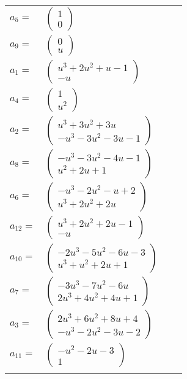 \documentclass[1p]{elsarticle_modified}
\theoremstyle{definition}
\begin{document}
\begin{tabular}{m{7pt} m{180pt} m{7pt} m{180pt} }
\flushright $a_{5}=$&$\begin{pmatrix}1\\0\end{pmatrix}$ \\
\flushright $a_{9}=$&$\begin{pmatrix}0\\u\end{pmatrix}$ \\
\flushright $a_{1}=$&$\begin{pmatrix}u^3+2 u^2+u-1\\- u\end{pmatrix}$ \\
\flushright $a_{4}=$&$\begin{pmatrix}1\\u^2\end{pmatrix}$ \\
\flushright $a_{2}=$&$\begin{pmatrix}u^3+3 u^2+3 u\\- u^3-3 u^2-3 u-1\end{pmatrix}$ \\
\flushright $a_{8}=$&$\begin{pmatrix}- u^3-3 u^2-4 u-1\\u^2+2 u+1\end{pmatrix}$ \\
\flushright $a_{6}=$&$\begin{pmatrix}- u^3-2 u^2- u+2\\u^3+2 u^2+2 u\end{pmatrix}$ \\
\flushright $a_{12}=$&$\begin{pmatrix}u^3+2 u^2+2 u-1\\- u\end{pmatrix}$ \\
\flushright $a_{10}=$&$\begin{pmatrix}-2 u^3-5 u^2-6 u-3\\u^3+u^2+2 u+1\end{pmatrix}$ \\
\flushright $a_{7}=$&$\begin{pmatrix}-3 u^3-7 u^2-6 u\\2 u^3+4 u^2+4 u+1\end{pmatrix}$ \\
\flushright $a_{3}=$&$\begin{pmatrix}2 u^3+6 u^2+8 u+4\\- u^3-2 u^2-3 u-2\end{pmatrix}$ \\
\flushright $a_{11}=$&$\begin{pmatrix}- u^2-2 u-3\\1\end{pmatrix}$\\&\end{tabular}
\end{document}

